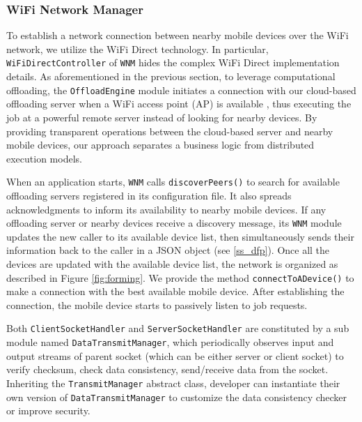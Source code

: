 \documentclass{sig-alternate}[10pt]
\begin{document}
\subsubsection{WiFi Network Manager}
To establish a network connection between nearby mobile devices over the WiFi network, we utilize the WiFi Direct technology. In particular, \texttt{WiFiDirectController} of \texttt{WNM} hides the complex WiFi Direct implementation details. As aforementioned in the previous section, to leverage computational offloading, the \texttt{OffloadEngine} module initiates a connection with our cloud-based offloading server when a WiFi access point (AP) is available \cite{kwon+:mobilesoft2015}, thus executing the job at a powerful remote server instead of looking for nearby devices. By providing transparent operations between the cloud-based server and nearby mobile devices, our approach separates a business logic from distributed execution models.

When an application starts, \texttt{WNM} calls \texttt{discoverPeers()} to search for available offloading servers registered in its configuration file. It also spreads acknowledgments to inform its availability to nearby mobile devices. If any offloading server or nearby devices receive a discovery message, its \texttt{WNM} module updates the new caller to its available device list, then simultaneously sends their information back to the caller in a JSON object (see \ref{ss_dfp}). Once all the devices are updated with the available device list, the network is organized as described in Figure \ref{fig:forming}. We provide the method \texttt{connectToADevice()} to make a connection with the best available mobile device. After establishing the connection, the mobile device starts to passively listen to job requests.


Both \texttt{ClientSocketHandler} and \texttt{ServerSocketHandler} are constituted by a sub module named \texttt{DataTransmitManager}, which periodically observes input and output streams of parent socket (which can be either server or client socket) to verify checksum, check data consistency, send/receive data from the socket. Inheriting the \texttt{TransmitManager} abstract class, developer can instantiate their own version of \texttt{DataTransmitManager} to customize the data consistency checker or improve security. 
\end{document}
